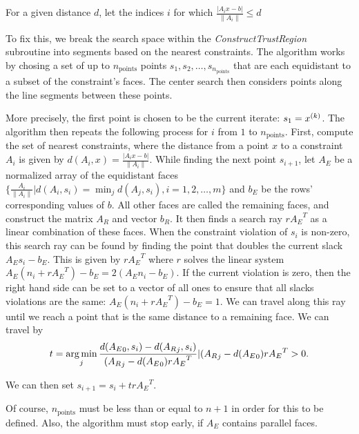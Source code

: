For a given distance $d$, let the indices $i$ for which $\frac {|A_i x - b|}{\|A_i\|} \le d$


To fix this, we break the search space within the \emph{ConstructTrustRegion} subroutine into segments based on the nearest constraints.
The algorithm works by chosing a set of up to $n_{\text{points}}$ points $s_1, s_2, \ldots, s_{n_{\text{points}}}$ that are each equidistant to a subset of the constraint's faces.
The center search then considers points along the line segments between these points.

More precisely, the first point is chosen to be the current iterate: $s_1 = {x}^{(k)}$.
The algorithm then repeats the following process for $i$ from $1$ to $n_{\text{points}}$.
First, compute the set of nearest constraints, where the distance from a point $x$ to a constraint $A_i$ is given by $d(A_i, x) = \frac {|A_i x - b|}{\|A_i\|}$.
While finding the next point $s_{i+1}$, let  $A_E$ be a normalized array of the equidistant faces $\{\frac{A_i}{\|A_i\|} | d(A_i, s_i) = \min_j d(A_j, s_i), i = 1, 2, \ldots, m\}$ and $b_E$ be the rows' corresponding values of $b$.
All other faces are called the remaining faces, and construct the matrix $A_R$ and vector $b_R$.
It then finds a search ray $r{A_E}^T$ as a linear combination of these faces.
When the constraint violation of $s_i$ is non-zero, this search ray can be found by finding the point that doubles the current slack ${A_E}s_i-{b_E}$.
This is given by $r{A_E}^T$ where $r$ solves the linear system ${A_E}(n_i + r{A_E}^T) - b_E = 2 ({A_E}n_i - b_E)$.
If the current violation is zero, then the right hand side can be set to a vector of all ones to ensure that all slacks violations are the same: $A_E(n_i + r{A_E}^T) - b_E = 1$.
We can travel along this ray until we reach a point that is the same distance to a remaining face.
We can travel by 
\begin{align}
t = \operatorname*{arg\,min}_j {\frac{d({A_E}_0, s_i) - d({A_R}_j, s_i)}{ ({A_R}_j - d({A_E}_0) r{A_E}^T} | ({A_R}_j - d({A_E}_0) r{A_E}^T > 0 }. 
\end{align}

We can then set $s_{i+1} = s_{i} + tr{A_E}^T$.

Of course, $n_{\text{points}}$ must be less than or equal to $n + 1$ in order for this to be defined.
Also, the algorithm must stop early, if $A_E$ contains parallel faces.

